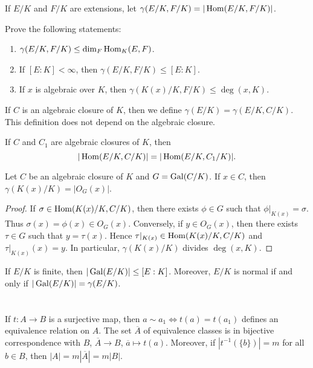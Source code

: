If $E/K$ and $F/K$ are extensions, 
let $\gamma(E/K,F/K)=|\operatorname{Hom}(E/K,F/K)|$. 

\begin{exercise}
Prove the following statements:
\begin{enumerate}
    \item $\gamma(E/K,F/K)\leq\dim_F\operatorname{Hom}_K(E,F)$.
    \item If $[E:K]<\infty$, then $\gamma(E/K,F/K)\leq[E:K]$. 
    \item If $x$ is algebraic over $K$, then $\gamma(K(x)/K,F/K)\leq\deg(x,K)$.
\end{enumerate}
\end{exercise}

If $C$ is an algebraic closure of $K$,
then we define $\gamma(E/K)=\gamma(E/K,C/K)$. This definition does
not depend on the algebraic closure. 

\begin{exercise}
\label{xca:gamma_C}
    If $C$ and $C_1$ are algebraic closures of $K$, then
    \[
    |\operatorname{Hom}(E/K,C/K)|=|\operatorname{Hom}(E/K,C_1/K)|.
    \]
\end{exercise}

\begin{proposition}
    Let $C$ be an algebraic closure of $K$ and $G=\operatorname{Gal}(C/K)$. 
    If $x\in C$, then $\gamma(K(x)/K)=|O_G(x)|$. 
\end{proposition}

\begin{proof}
    If $\sigma\in\operatorname{Hom}(K(x)/K,C/K)$, then there exists $\phi\in G$ such that
    $\phi|_{K(x)}=\sigma$. Thus $\sigma(x)=\phi(x)\in O_G(x)$. Conversely,
    if $y\in O_G(x)$, then there exists $\tau\in G$ such that
    $y=\tau(x)$. Hence $\tau|_{K(x)}\in\operatorname{Hom}(K(x)/K,C/K)$ and 
    $\tau|_{K(x)}(x)=y$. In particular, $\gamma(K(x)/K)$ divides $\deg(x,K)$. 
\end{proof}


\begin{exercise}
If $E/K$ is finite, then $|\operatorname{Gal}(E/K)|\leq [E:K]$. Moreover, 
$E/K$ is normal if and only if $|\operatorname{Gal}(E/K)|=\gamma(E/K)$. 
\end{exercise}

\chapter{}

If $t\colon A\to B$ is a surjective map, then 
$a\sim a_1\Longleftrightarrow t(a)=t(a_1)$ 
defines an equivalence relation on $A$. The set $\overline{A}$ 
of equivalence classes is in bijective correspondence with $B$,
$\overline{A}\to B$, $\overline{a}\mapsto t(a)$. 
Moreover, if $|t^{-1}(\{b\})|=m$ for all $b\in B$, then 
$|A|=m|\overline{A}|=m|B|$. 

